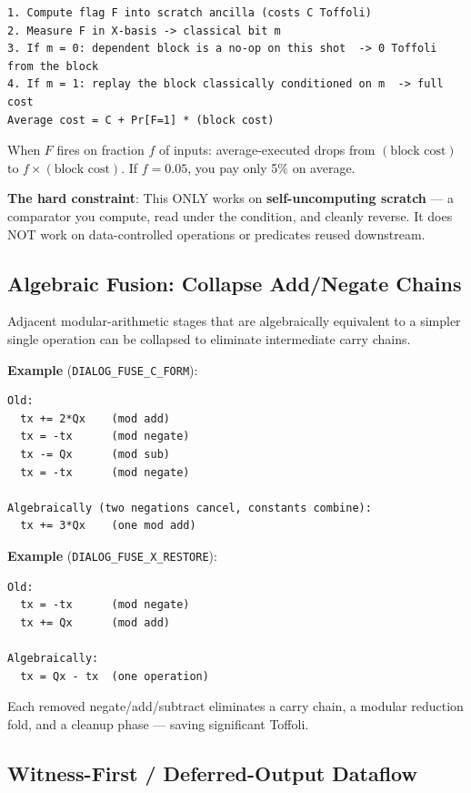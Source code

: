 \documentclass[11pt,a4paper]{article}
\begin{document}
\begin{lstlisting}
1. Compute flag F into scratch ancilla (costs C Toffoli)
2. Measure F in X-basis -> classical bit m
3. If m = 0: dependent block is a no-op on this shot  -> 0 Toffoli from the block
4. If m = 1: replay the block classically conditioned on m  -> full cost
Average cost = C + Pr[F=1] * (block cost)
\end{lstlisting}

When $F$ fires on fraction $f$ of inputs: average-executed drops from $(\text{block cost})$ to
$f \times (\text{block cost})$. If $f = 0.05$, you pay only 5\% on average.

\textbf{The hard constraint}: This ONLY works on \textbf{self-uncomputing scratch} --- a comparator
you compute, read under the condition, and cleanly reverse. It does NOT work on data-controlled
operations or predicates reused downstream.

\subsection{Algebraic Fusion: Collapse Add/Negate Chains}
\label{sec:fusion}

Adjacent modular-arithmetic stages that are algebraically equivalent to a simpler single
operation can be collapsed to eliminate intermediate carry chains.

\textbf{Example} (\texttt{DIALOG\_FUSE\_C\_FORM}):
\begin{lstlisting}
Old:
  tx += 2*Qx    (mod add)
  tx = -tx      (mod negate)
  tx -= Qx      (mod sub)
  tx = -tx      (mod negate)

Algebraically (two negations cancel, constants combine):
  tx += 3*Qx    (one mod add)
\end{lstlisting}

\textbf{Example} (\texttt{DIALOG\_FUSE\_X\_RESTORE}):
\begin{lstlisting}
Old:
  tx = -tx      (mod negate)
  tx += Qx      (mod add)

Algebraically:
  tx = Qx - tx  (one operation)
\end{lstlisting}

Each removed negate/add/subtract eliminates a carry chain, a modular reduction fold, and a
cleanup phase --- saving significant Toffoli.

\subsection{Witness-First / Deferred-Output Dataflow}
\label{sec:witness}
\end{document}
